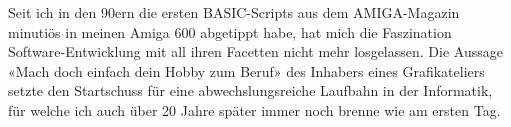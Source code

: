 \documentclass[10pt]{developercv} %
\begin{document}
\begin{minipage}[t]{1\textwidth} %
	\vspace{-\baselineskip} %

	\hspace{0.2cm}
	\hspace{0.2cm}
	\hspace{0.2cm}
\end{minipage}

\vspace{0.5cm} %



\begin{minipage}[t]{0.4\textwidth} %
	\vspace{-\baselineskip} %
	Seit ich in den 90ern die ersten BASIC-Scripts aus dem AMIGA-Magazin minutiös in meinen Amiga 600 abgetippt habe, hat mich die Faszination Software-Entwicklung mit all ihren Facetten nicht mehr losgelassen. Die Aussage «Mach doch einfach dein Hobby zum Beruf» des Inhabers eines Grafikateliers setzte den Startschuss für eine abwechslungsreiche Laufbahn in der Informatik, für welche ich auch über 20 Jahre später immer noch brenne wie am ersten Tag.\\
\end{minipage}
\hfill %
\vspace{0.25cm} %
\begin{minipage}[t]{0.5\textwidth} %
	\vspace{-\baselineskip} %

	\begin{barchart}{5.5} %
	\end{barchart}
\end{minipage}
\end{document}
